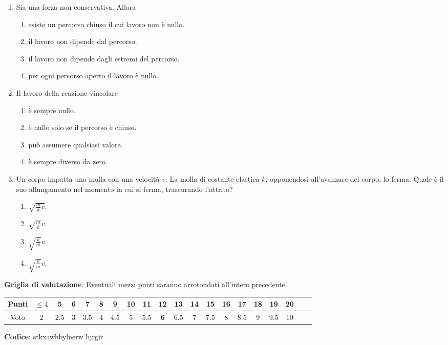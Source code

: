 \documentclass{article}
\begin{document}
\begin{enumerate}
\begin{enumerate}[label=\Alph*.]
    \item $\frac{2v^2}{g\mu}}$.
    \item $\frac{1}{2}v^2-\mu g$.
  \end{enumerate}
  \item Sia  una forza non conservativa. Allora
  \begin{enumerate}[label=\Alph*.]
    \item esiste un percorso chiuso il cui lavoro non è nullo.
    \item il lavoro non dipende dal percorso.
    \item il lavoro non dipende dagli estremi del percorso.
    \item per ogni percorso aperto il lavoro è nullo.
  \end{enumerate}
  \item Il lavoro della reazione vincolare
  \begin{enumerate}[label=\Alph*.]
    \item è sempre nullo.
    \item è nullo solo se il percorso è chiuso.
    \item può assumere qualsiasi valore.
    \item è sempre diverso da zero.
  \end{enumerate}
  \item Un corpo impatta una molla con una velocità $v$. La molla di costante elastica $k$, opponendosi all'avanzare del corpo, lo ferma. Quale è il suo allungamento nel momento in cui si ferma, trascurando l'attrito?
  \begin{enumerate}[label=\Alph*.]
    \item $\sqrt{\frac{m}{k}v}$.
    \item $\sqrt{\frac{m}{k}}v$.
    \item $\sqrt{\frac{k}{m}}v$.
    \item $\sqrt{\frac{k}{m}}v$.
  \end{enumerate}
\end{enumerate}








\newpage \maketitle \centering \textbf{Griglia di valutazione}. Eventuali mezzi punti saranno arrotondati all'intero precedente. \begin{table}[h]     \centering \begin{tabular}{|c|c|c|c|c|c|c|c|c|c|c|c|c|c|c|c|c|c|c|c|} \hline Punti &  $\leq 4$ & 5 & 6 & 7 & 8 & 9 & 10 & 11 & \textbf{12} & 13 & 14 & 15 & 16 & 17 & 18 & 19 & 20 \\ \hline Voto & 2 & 2.5 & 3 & 3.5 & 4 & 4.5 & 5 & 5.5 & \textbf{6} & 6.5 & 7 & 7.5 & 8 & 8.5 & 9 & 9.5 & 10 \\ \hline \end{tabular} \end{table}
\textbf{Codice}: stkxawhbylnerw hjrgir
\end{document}
